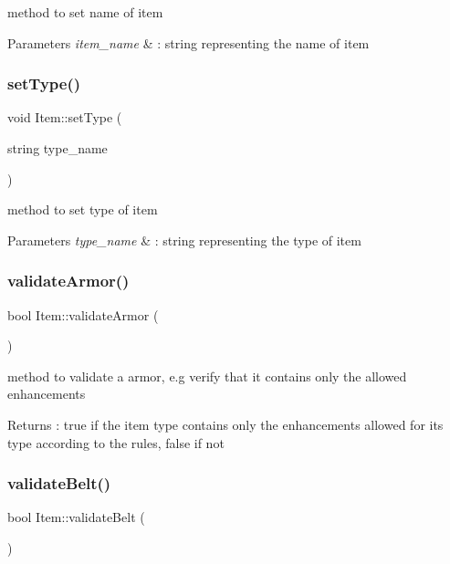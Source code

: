 method to set name of item 
\begin{DoxyParams}{Parameters}
{\em item\+\_\+name} & \+: string representing the name of item \\
\hline
\end{DoxyParams}
\hypertarget{class_item_a1712084c3f4a335526c027f0aa0f862a}{}\label{class_item_a1712084c3f4a335526c027f0aa0f862a} 
\subsubsection{\texorpdfstring{set\+Type()}{setType()}}
{\footnotesize\ttfamily void Item\+::set\+Type (\begin{DoxyParamCaption}\item[{string}]{type\+\_\+name }\end{DoxyParamCaption})}

method to set type of item 
\begin{DoxyParams}{Parameters}
{\em type\+\_\+name} & \+: string representing the type of item \\
\hline
\end{DoxyParams}
\hypertarget{class_item_a67c7da153ee5b7346c9ed2f85153f5cb}{}\label{class_item_a67c7da153ee5b7346c9ed2f85153f5cb} 
\subsubsection{\texorpdfstring{validate\+Armor()}{validateArmor()}}
{\footnotesize\ttfamily bool Item\+::validate\+Armor (\begin{DoxyParamCaption}{ }\end{DoxyParamCaption})}

method to validate a armor, e.\+g verify that it contains only the allowed enhancements \begin{DoxyReturn}{Returns}
\+: true if the item type contains only the enhancements allowed for its type according to the rules, false if not 
\end{DoxyReturn}
\hypertarget{class_item_a324285b377b1f21ec77381f16d406517}{}\label{class_item_a324285b377b1f21ec77381f16d406517} 
\subsubsection{\texorpdfstring{validate\+Belt()}{validateBelt()}}
{\footnotesize\ttfamily bool Item\+::validate\+Belt (\begin{DoxyParamCaption}{ }\end{DoxyParamCaption})}


